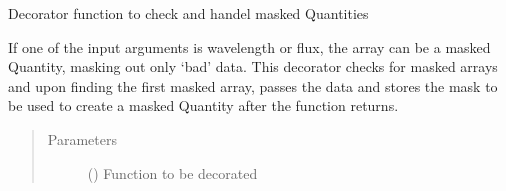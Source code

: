 \documentclass[a4paper,10pt,english]{sphinxmanual}
\begin{document}

\begin{fulllineitems}
\label{\detokenize{cascade.exoplanet_tools:cascade.exoplanet_tools.exoplanet_tools.masked_array_input}}
Decorator function to check and handel masked Quantities

If one of the input arguments is wavelength or flux, the array can be
a masked Quantity, masking out only ‘bad’ data. This decorator checks for
masked arrays and upon finding the first masked array, passes the data
and stores the mask to be used to create a masked Quantity after the
function returns.
\begin{quote}\begin{description}
\item[{Parameters}] \leavevmode
{} () \textendash{} Function to be decorated

\end{description}\end{quote}

\end{fulllineitems}

\end{document}
